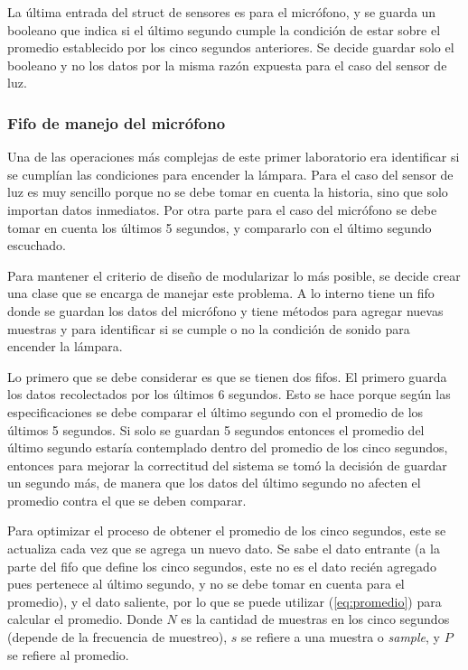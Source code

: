 La última entrada del struct de sensores es para el micrófono, y se guarda un booleano que indica si
el último segundo cumple la condición de estar sobre el promedio establecido por los cinco segundos
anteriores. Se decide guardar solo el booleano y no los datos por la misma razón expuesta para el
caso del sensor de luz.

\subsubsection{Fifo de manejo del micrófono}

Una de las operaciones más complejas de este primer laboratorio era identificar si se cumplían las
condiciones para encender la lámpara. Para el caso del sensor de luz es muy sencillo porque no se
debe tomar en cuenta la historia, sino que solo importan datos inmediatos. Por otra parte para el
caso del micrófono se debe tomar en cuenta los últimos 5 segundos, y compararlo con el último
segundo escuchado.

Para mantener el criterio de diseño de modularizar lo más posible, se decide crear una clase que se
encarga de manejar este problema. A lo interno tiene un fifo donde se guardan los datos del
micrófono y tiene métodos para agregar nuevas muestras y para identificar si se cumple o no la
condición de sonido para encender la lámpara.

Lo primero que se debe considerar es que se tienen dos fifos. El primero guarda los datos
recolectados por los últimos 6 segundos. Esto se hace porque según las especificaciones se debe
comparar el último segundo con el promedio de los últimos 5 segundos. Si solo se guardan 5 segundos
entonces el promedio del último segundo estaría contemplado dentro del promedio de los cinco
segundos, entonces para mejorar la correctitud del sistema se tomó la decisión de guardar un segundo
más, de manera que los datos del último segundo no afecten el promedio contra el que se deben
comparar.

Para optimizar el proceso de obtener el promedio de los cinco segundos, este se
actualiza cada vez que se agrega un nuevo dato. Se sabe el dato entrante (a la parte del fifo que
define los cinco segundos, este no es el dato recién agregado pues pertenece al último segundo, y
no se debe tomar en cuenta para el promedio), y el dato saliente, por lo que se puede utilizar
(\ref{eq:promedio}) para calcular el promedio. Donde $N$ es la cantidad de muestras en los cinco
segundos (depende de la frecuencia de muestreo), $s$ se refiere a una muestra o \textit{sample}, y
$P$ se refiere al promedio.

